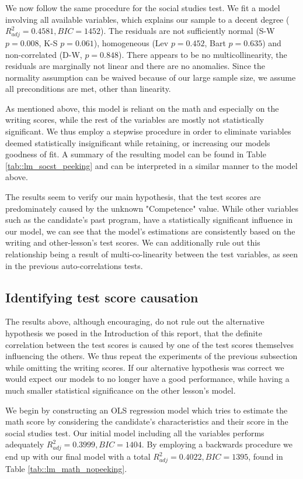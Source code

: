 \documentclass[10pt, a4paper]{article}
\begin{document}
	We now follow the same procedure for the social studies test. We fit a model involving all available variables, which explains our sample to a decent degree ($R^2_{adj} = 0.4581, BIC=1452$). The residuals are not sufficiently normal (S-W $p = 0.008$, K-S $p=0.061$), homogeneous (Lev $p = 0.452$, Bart $p = 0.635$) and non-correlated (D-W, $p=0.848$). There appears to be no multicollinearity, the residuals are marginally not linear and there are no anomalies. Since the normality assumption can be waived because of our large sample size, we assume all preconditions are met, other than linearity.
	
	As mentioned above, this model is reliant on the math and especially on the writing scores, while the rest of the variables are mostly not statistically significant. We thus employ a stepwise procedure in order to eliminate variables deemed statistically insignificant while retaining, or increasing our models goodness of fit. A summary of the resulting model can be found in Table \ref{tab::lm_socst_peeking} and can be interpreted in a similar manner to the model above.
	
	The results seem to verify our main hypothesis, that the test scores are predominately caused by the unknown "Competence" value. While other variables such as the candidate's past program, have a statistically significant influence in our model, we can see that the model's estimations are consistently based on the writing and other-lesson's test scores. We can additionally rule out this relationship being a result of multi-co-linearity between the test variables, as seen in the previous auto-correlations tests.
	\unskip
	\subsection{Identifying test score causation}
	
	The results above, although encouraging, do not rule out the alternative hypothesis we posed in the Introduction of this report, that the definite correlation between the test scores is caused by one of the test scores themselves influencing the others. We thus repeat the experiments of the previous subsection while omitting the writing scores. If our alternative hypothesis was correct we would expect our models to no longer have a good performance, while having a much smaller statistical significance on the other lesson's model.
	
	We begin by constructing an OLS regression model which tries to estimate the math score by considering the candidate's characteristics and their score in the social studies test. Our initial model including all the variables performs adequately $R^2_{adj} = 0.3999, BIC=1404$. By employing a backwards procedure we end up with our final model with a total $R^2_{adj} = 0.4022, BIC=1395$, found in Table \ref{tab::lm_math_nopeeking}.
	
\end{document}
